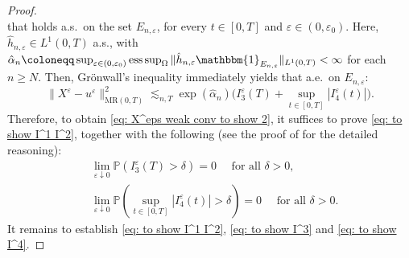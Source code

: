\documentclass{amsart}
\renewcommand{\MR}{\mathrm{MR}}
\newcommand{\one}{\mathbbm{1}}
\newcommand{\<}{\langle}
\newcommand{\?}{\rangle}
\DeclareMathOperator*{\esssup}{\textup{ess\,sup}}
\theoremstyle{plain}
\theoremstyle{remark}
\theoremstyle{plain}
\numberwithin{equation}{section}
\renewcommand{\P}{\mathbb{P}}
\newcommand{\Om}{\Omega}
\newcommand{\eps}{\varepsilon}
\begin{document}
\begin{proof}
\begin{equation}
    \end{equation}
    that holds a.s.\ on the set $E_{n,\eps}$, for every $t\in[0,T]$ and $\eps\in(0,\eps_0)$. Here,  $\hat{h}_{n,\eps}\in L^1(0,T)$ a.s., with $\hat{\alpha}_n\coloneqq \sup_{\eps\in(0,\eps_0)}\esssup_\Om \|\hat{h}_{n,\eps}\one_{E_{n,\eps}}\|_{L^1(0,T)}<\infty$ for each $n\geq N$. 
    Then, Gr\"onwall's inequality immediately yields that a.e.\ on $E_{n,\eps}$:
    \begin{equation*}
    \|X^\eps-u^{\eps}\|_{\MR(0,T)}^2\lesssim_{n,T}\exp(\hat{\alpha}_n)\big({I}_3^\eps(T)+\sup_{t\in[0,T]}|{I}_4^\eps(t)|\big).
    \end{equation*}  
Therefore, to obtain   \eqref{eq: X^eps weak conv to show 2}, it suffices to prove  \eqref{eq: to show I^1 I^2}, together with the following (see the proof of \cite[Prop.\ 4.12]{TV24} for the detailed reasoning): 
    \begin{align}
    &\lim_{\eps\downarrow 0}\P({I}_3^\eps(T)> \delta)=0\quad \text{ for all } \delta>0, \label{eq: to show I^3}\\
    &\lim_{\eps\downarrow 0}\P(\sup_{t\in[0,T]}|{I}_4^\eps(t)|>\delta)=0\quad \text{ for all } \delta>0. \label{eq: to show I^4}
    \end{align}
    It remains to establish \eqref{eq: to show I^1 I^2}, \eqref{eq: to show I^3} and \eqref{eq: to show I^4}. 


\end{proof}
\end{document}
